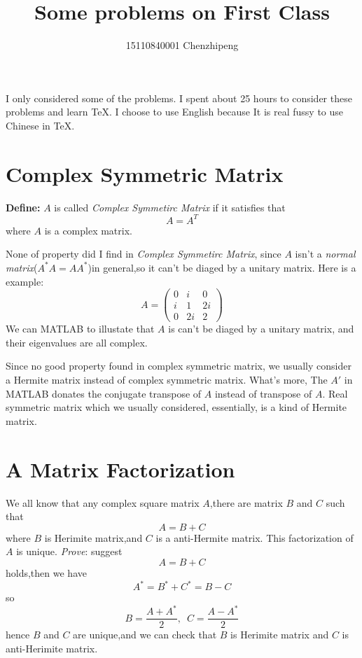 \documentclass[a4paper,12pt]{article}
\author{15110840001 Chenzhipeng}
\title{Some problems on First Class}
\begin{document}
\maketitle
I only considered some of the problems. I spent about 25 hours to consider these problems and learn \TeX. I choose to use English because It is real fussy to use Chinese in \TeX.

\section{Complex Symmetric Matrix}

\textbf{Define:} $A$ is called \textit{Complex Symmetirc Matrix}\newline
if it satisfies that 
\[ A=A^T \] 
where $A$ is a complex matrix.\newline

None of property did I find in \textit{Complex Symmetirc Matrix}, since $A$ isn't a \textit{normal matrix}($A^*A=AA^*$)in general,so it can't be diaged by a unitary matrix.\newline
Here is a example: 
\[ A = \left( \begin{array}{ccc}
0 & i  & 0 \\
i & 1  & 2i \\
0 & 2i & 2 \end{array} \right) \]
We can MATLAB to illustate that $A$ is can't be diaged by a unitary matrix, and their eigenvalues are all complex.\newline

Since no good property found in complex symmetric matrix, we usually consider a Hermite matrix instead of complex symmetric matrix. What's more, The $A'$ in MATLAB donates the conjugate transpose of $A$ instead of transpose of $ A $. Real symmetric matrix which we usually considered, essentially, is a kind of Hermite matrix.


\section{A Matrix Factorization}

We all know that any complex square matrix $A$,there are matrix $B$ and $C$ such that 
\[ A=B+C \]
where $B$ is Herimite matrix,and $C$ is a anti-Hermite matrix. This factorization of $A$ is unique. \newline
\textit{Prove}: suggest
\[ A = B + C \]
holds,then we have
\[ A^* = B^* + C^* = B - C \]
so
\[ B = \frac{A + A^*}{2} ,\,\,\, C = \frac{A - A^*}{2} \]
hence $B$ and $C$ are unique,and we can check that $B$ is Herimite matrix and $C$ is anti-Herimite matrix.
\end{document}
